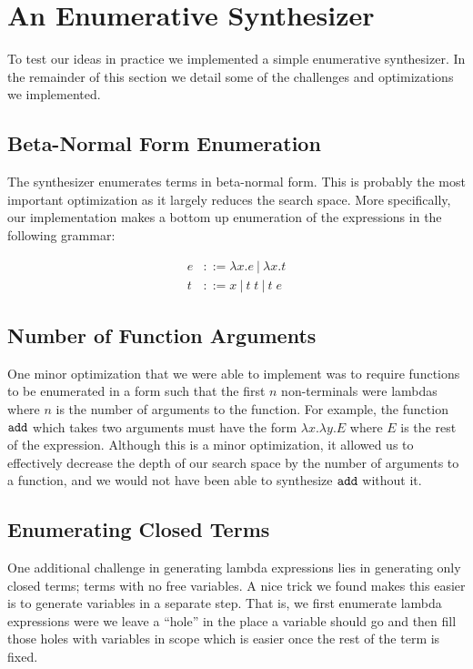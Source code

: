 \section{An Enumerative Synthesizer} \label{sec:optimizations}
%
To test our ideas in practice we implemented a simple
enumerative synthesizer.
%
In the remainder of this section we detail some of the
challenges and optimizations we implemented.

\subsection{Beta-Normal Form Enumeration}
%
The synthesizer enumerates terms in beta-normal form.
%
This is probably the most important optimization as it
largely reduces the search space.
%
More specifically, our implementation makes a bottom up
enumeration of the expressions in the following grammar:

\begin{align*}
  e & ::= \lambda x. e ~|~ \lambda x. t \\
  t & ::= x ~|~ t\;t ~|~ t\;e
\end{align*}

\subsection{Number of Function Arguments}
One minor optimization that we were able to implement was to require
  functions to be enumerated in a form such that the first $n$ non-terminals
  were lambdas where $n$ is the number of arguments to the function.
For example, the function $\texttt{add}$ which takes two arguments must have the
  form $\lambda x. \lambda y. E$ where $E$ is the rest of the expression.
Although this is a minor optimization, it allowed us to effectively decrease
  the depth of our search space by the number of arguments to a function, and
  we would not have been able to synthesize $\texttt{add}$ without it.

\subsection{Enumerating Closed Terms}
%
One additional challenge in generating lambda expressions
lies in generating only closed terms; terms with no free
variables.
%
A nice trick we found makes this easier is to generate
variables in a separate step.
%
That is, we first enumerate lambda expressions were we leave
a ``hole'' in the place a variable should go and then fill
those holes with variables in scope which is easier once the
rest of the term is fixed.

